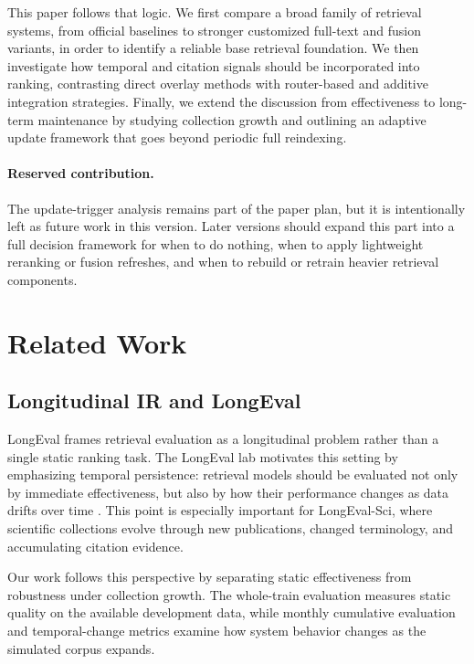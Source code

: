 \documentclass[11pt]{article}
\begin{document}
This paper follows that logic. We first compare a broad family of retrieval systems, from official baselines to stronger customized full-text and fusion variants, in order to identify a reliable base retrieval foundation. We then investigate how temporal and citation signals should be incorporated into ranking, contrasting direct overlay methods with router-based and additive integration strategies. Finally, we extend the discussion from effectiveness to long-term maintenance by studying collection growth and outlining an adaptive update framework that goes beyond periodic full reindexing.

\paragraph{Reserved contribution.}
The update-trigger analysis remains part of the paper plan, but it is intentionally left as future work in this version. Later versions should expand this part into a full decision framework for when to do nothing, when to apply lightweight reranking or fusion refreshes, and when to rebuild or retrain heavier retrieval components.

\section{Related Work}

\subsection{Longitudinal IR and LongEval}

LongEval frames retrieval evaluation as a longitudinal problem rather than a single static ranking task. The LongEval lab motivates this setting by emphasizing temporal persistence: retrieval models should be evaluated not only by immediate effectiveness, but also by how their performance changes as data drifts over time \cite{cancellieri_longeval_2025}. This point is especially important for LongEval-Sci, where scientific collections evolve through new publications, changed terminology, and accumulating citation evidence.

Our work follows this perspective by separating static effectiveness from robustness under collection growth. The whole-train evaluation measures static quality on the available development data, while monthly cumulative evaluation and temporal-change metrics examine how system behavior changes as the simulated corpus expands.
\end{document}
